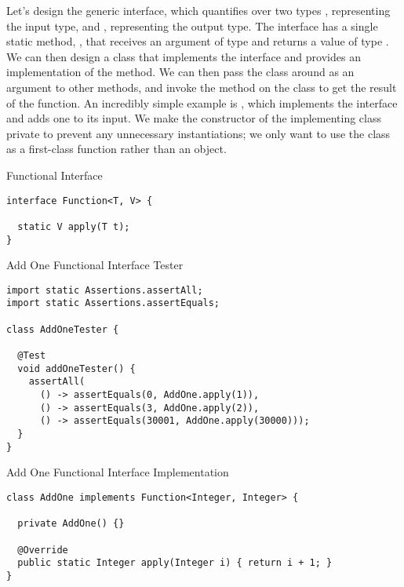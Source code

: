 
Let's design the generic  interface, which quantifies over two types , representing the input type, and , representing the output type. The  interface has a single static method, , that receives an argument of type  and returns a value of type . We can then design a class that implements the  interface and provides an implementation of the  method. We can then pass the class around as an argument to other methods, and invoke the  method on the class to get the result of the function. An incredibly simple example is , which implements the  interface and adds one to its input. We make the constructor of the implementing class private to prevent any unnecessary instantiations; we only want to use the class as a first-class function rather than an object.

\begin{cl}[]{Functional Interface}
\begin{lstlisting}[language=MyJava]
interface Function<T, V> {

  static V apply(T t); 
}
\end{lstlisting}
\end{cl}

\begin{cl}[]{Add One Functional Interface Tester}
\begin{lstlisting}[language=MyJava]
import static Assertions.assertAll;
import static Assertions.assertEquals;

class AddOneTester {

  @Test
  void addOneTester() {
    assertAll(
      () -> assertEquals(0, AddOne.apply(1)),
      () -> assertEquals(3, AddOne.apply(2)),
      () -> assertEquals(30001, AddOne.apply(30000)));
  }
}
\end{lstlisting}
\end{cl}
\begin{cl}[]{Add One Functional Interface Implementation}
\begin{lstlisting}[language=MyJava]
class AddOne implements Function<Integer, Integer> {

  private AddOne() {}

  @Override
  public static Integer apply(Integer i) { return i + 1; }
}
\end{lstlisting}
\end{cl}

